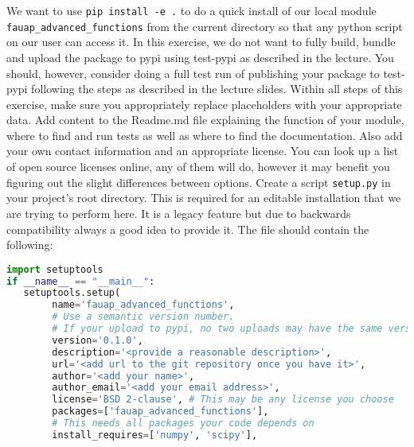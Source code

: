 \documentclass[]{erlangen-problemset}
\begin{document}
\begin{problem}[title={Making our module installable with pip}]
    We want to use \texttt{pip install -e .} to do a quick install of our local module \texttt{fauap\_advanced\_functions} from the current directory so that any python script on our user can access it. 
    In this exercise, we do not want to fully build, bundle and upload the package to pypi using test-pypi as described in the lecture. 
    You should, however, consider doing a full test run of publishing your package to test-pypi following the steps as described in the lecture slides.
    Within all steps of this exercise, make sure you appropriately replace placeholders with your appropriate data.
\noindent
\Question Add content to the Readme.md file explaining the function of your module, where to find and run tests as well as where to find the documentation. 
Also add your own contact information and an appropriate license. 
You can look up a list of open source licenses online, any of them will do, however it may benefit you figuring out the slight differences between options.
\Question Create a script \texttt{setup.py} in your project's root directory. 
    This is required for an editable installation that we are trying to perform here.
    It is a legacy feature but due to backwards compatibility always a good idea to provide it. 
    The file should contain the following:
    \begin{lstlisting}[language=Python]
import setuptools 
if __name__ == "__main__": 
   setuptools.setup(
        name='fauap_advanced_functions',
        # Use a semantic version number. 
        # If your upload to pypi, no two uploads may have the same version
        version='0.1.0', 
        description='<provide a reasonable description>',
        url='<add url to the git repository once you have it>',
        author='<add your name>',
        author_email='<add your email address>',
        license='BSD 2-clause', # This may be any license you choose
        packages=['fauap_advanced_functions'],
        # This needs all packages your code depends on
        install_requires=['numpy', 'scipy'], 


\end{lstlisting}
\end{problem}
\end{document}
